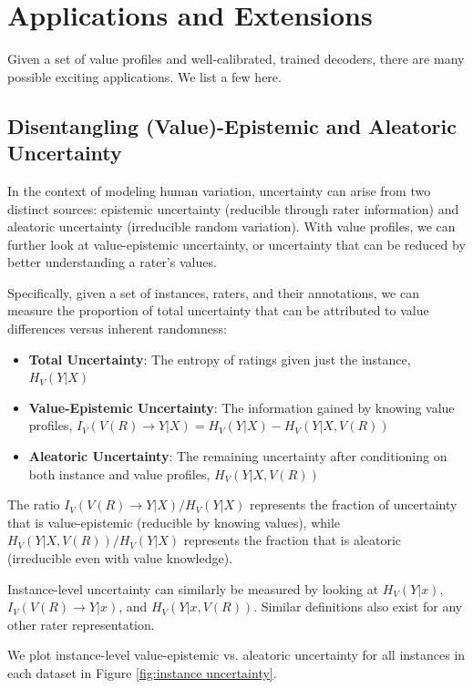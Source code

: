 \documentclass[11pt]{article}
\begin{document}
\section{Applications and Extensions}
\label{app:applications}

Given a set of value profiles and well-calibrated, trained decoders, there are many possible exciting applications. We list a few here.

\subsection{Disentangling (Value)-Epistemic and Aleatoric Uncertainty}

In the context of modeling human variation, uncertainty can arise from two distinct sources: epistemic uncertainty (reducible through rater information) and aleatoric uncertainty (irreducible random variation).
With value profiles, we can further look at value-epistemic uncertainty, or uncertainty that can be reduced by better understanding a rater's values.

Specifically, given a set of instances, raters, and their annotations, we can measure the proportion of total uncertainty that can be attributed to value differences versus inherent randomness:

\begin{itemize}
\item \textbf{Total Uncertainty}: The entropy of ratings given just the instance, $H_V(Y|X)$
\item \textbf{Value-Epistemic Uncertainty}: The information gained by knowing value profiles, $I_V(V(R) \to Y|X) = H_V(Y|X) - H_V(Y|X,V(R))$
\item \textbf{Aleatoric Uncertainty}: The remaining uncertainty after conditioning on both instance and value profiles, $H_V(Y|X,V(R))$
\end{itemize}

The ratio $I_V(V(R) \to Y|X) / H_V(Y|X)$ represents the fraction of uncertainty that is value-epistemic (reducible by knowing values), while $H_V(Y|X,V(R)) / H_V(Y|X)$ represents the fraction that is aleatoric (irreducible even with value knowledge).

Instance-level uncertainty can similarly be measured by looking at $H_V(Y|x)$, $I_V(V(R) \to Y|x)$, and $H_V(Y|x,V(R))$. Similar definitions also exist for any other rater representation.

We plot instance-level value-epistemic vs. aleatoric uncertainty for all instances in each dataset in Figure \ref{fig:instance uncertainty}.
\end{document}
